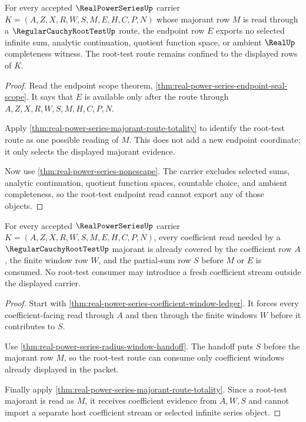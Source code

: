 \begin{theorem}
\label{thm:realpowerseries-root-endpoint-nonescape}
For every accepted $\RealPowerSeriesUp$ carrier $K=(A,Z,X,R,W,S,M,E,H,C,P,N)$ whose majorant row $M$ is read through a $\RegularCauchyRootTestUp$ route, the endpoint row $E$ exports no selected infinite sum, analytic continuation, quotient function space, or ambient $\RealUp$ completeness witness. The root-test route remains confined to the displayed rows of $K$.
\end{theorem}
\begin{proof}
Read the endpoint scope theorem, \autoref{thm:real-power-series-endpoint-seal-scope}. It says that $E$ is available only after the route through $A,Z,X,R,W,S,M,H,C,P,N$.

Apply \autoref{thm:real-power-series-majorant-route-totality} to identify the root-test route as one possible reading of $M$. This does not add a new endpoint coordinate; it only selects the displayed majorant evidence.

Now use \autoref{thm:real-power-series-nonescape}. The carrier excludes selected sums, analytic continuation, quotient function spaces, countable choice, and ambient completeness, so the root-test endpoint read cannot export any of those objects.
\end{proof}

\begin{theorem}
\label{thm:realpowerseries-root-coefficient-window-coverage}
For every accepted $\RealPowerSeriesUp$ carrier $K=(A,Z,X,R,W,S,M,E,H,C,P,N)$, every coefficient read needed by a $\RegularCauchyRootTestUp$ majorant is already covered by the coefficient row $A$, the finite window row $W$, and the partial-sum row $S$ before $M$ or $E$ is consumed. No root-test consumer may introduce a fresh coefficient stream outside the displayed carrier.
\end{theorem}
\begin{proof}
Start with \autoref{thm:real-power-series-coefficient-window-ledger}. It forces every coefficient-facing read through $A$ and then through the finite windows $W$ before it contributes to $S$.

Use \autoref{thm:real-power-series-radius-window-handoff}. The handoff puts $S$ before the majorant row $M$, so the root-test route can consume only coefficient windows already displayed in the packet.

Finally apply \autoref{thm:real-power-series-majorant-route-totality}. Since a root-test majorant is read as $M$, it receives coefficient evidence from $A,W,S$ and cannot import a separate host coefficient stream or selected infinite series object.
\end{proof}

